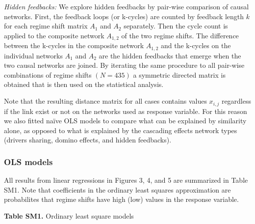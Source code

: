 \documentclass[9pt,]{article}
\begin{document}
\emph{Hidden feedbacks:} We explore hidden feedbacks by pair-wise
comparison of causal networks. First, the feedback loops (or k-cycles)
are counted by feedback length \(k\) for each regime shift matrix
\(A_1\) and \(A_2\) separately. Then the cycle count is applied to the
composite network \(A_{1,2}\) of the two regime shifts. The difference
between the k-cycles in the composite network \(A_{1,2}\) and the
k-cycles on the individual networks \(A_1\) and \(A_2\) are the hidden
feedbacks that emerge when the two causal networks are joined. By
iterating the same procedure to all pair-wise combinations of regime
shifts \((N=435)\) a symmetric directed matrix is obtained that is then
used on the statistical analysis.

Note that the resulting distance matrix for all cases contains values
\(x_{i,j}\) regardless if the link exist or not on the networks used as
response variable. For this reason we also fitted naïve OLS models to
compare what can be explained by similarity alone, as opposed to what is
explained by the cascading effects network types (drivers sharing,
domino effects, and hidden feedbacks).

\subsubsection{OLS models}\label{ols-models}

All results from linear regressions in Figures 3, 4, and 5 are
summarized in Table SM1. Note that coefficients in the ordinary least
squares approximation are probabilites that regime shifts have high
(low) values in the response variable.

\textbf{Table SM1.} Ordinary least square models

\begingroup  \footnotesize 
\end{document}
